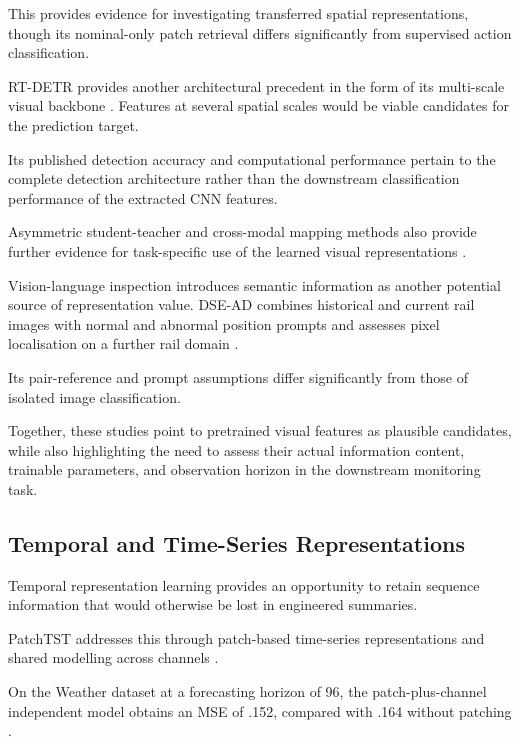 This provides evidence for investigating transferred spatial representations, though its
nominal-only patch retrieval differs significantly from supervised action classification.

RT-DETR provides another architectural precedent in the form of its multi-scale visual backbone
\parencite[Sections~4.1--4.2]{Zhao2024RTDETR}. Features at several spatial scales would be viable
candidates for the prediction target.

Its published detection accuracy and computational performance pertain to the complete detection
architecture rather than the downstream classification performance of the extracted CNN features.

Asymmetric student-teacher and cross-modal mapping methods also provide further evidence for
task-specific use of the learned visual representations
\parencite{Rudolph2023Asymmetric,Costanzino2024Multimodal}.

Vision-language inspection introduces semantic information as another potential source of
representation value. DSE-AD combines historical and current rail images with normal and abnormal
position prompts and assesses pixel localisation on a further rail domain \parencite{P031}.

Its pair-reference and prompt assumptions differ significantly from those of isolated image
classification.

Together, these studies point to pretrained visual features as plausible candidates, while also
highlighting the need to assess their actual information content, trainable parameters, and
observation horizon in the downstream monitoring task.

\subsection{Temporal and Time-Series Representations}

Temporal representation learning provides an opportunity to retain sequence information that would
otherwise be lost in engineered summaries.

PatchTST addresses this through patch-based time-series representations and shared modelling across
channels \parencite[Sections~3.1--3.2]{Nie2023PatchTST}.

On the Weather dataset at a forecasting horizon of 96, the patch-plus-channel independent model
obtains an MSE of .152, compared with .164 without patching \parencite[Table~7]{Nie2023PatchTST}.

